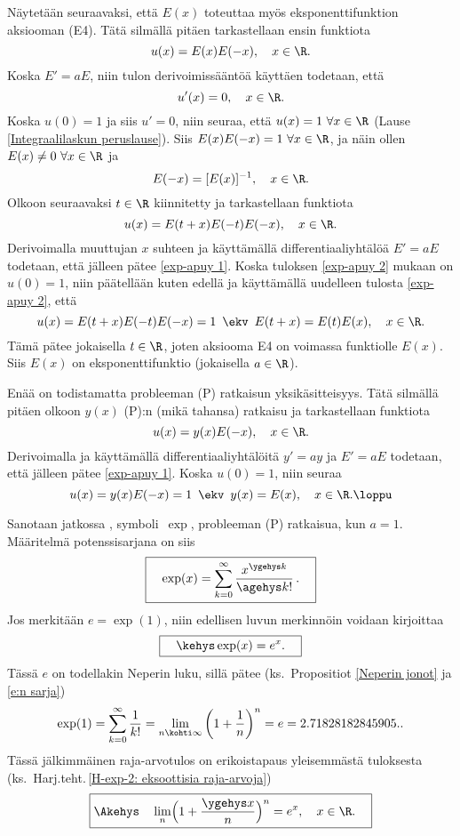 Näytetään seuraavaksi, että $E(x)$ toteuttaa myös eksponenttifunktion aksiooman (E4). Tätä
silmällä pitäen tarkastellaan ensin funktiota
\[
u(x) = E(x)E(-x), \quad x\in\R.
\]
Koska $E'=aE$, niin tulon derivoimissääntöä käyttäen todetaan, että
\begin{equation} \label{exp-apuy 1}
u'(x)=0, \quad x\in\R.
\end{equation}
Koska $u(0)=1$ ja siis $u'=0$, niin seuraa, että $u(x)=1\ \forall x\in\R$
(Lause \ref{Integraalilaskun peruslause}). Siis $E(x)E(-x)=1\ \forall x\in\R$, ja näin ollen 
$E(x) \neq 0\ \forall x\in\R$ ja
\begin{equation} \label{exp-apuy 2}
E(-x) = [E(x)]^{-1}, \quad x\in\R.
\end{equation}
Olkoon seuraavaksi $t\in\R$ kiinnitetty ja tarkastellaan funktiota
\[
u(x) = E(t+x)E(-t)E(-x), \quad x\in\R.
\]
Derivoimalla muuttujan $x$ suhteen ja käyttämällä differentiaaliyhtälöä $E'=aE$ todetaan, että 
jälleen pätee \eqref{exp-apuy 1}. Koska tuloksen \eqref{exp-apuy 2} mukaan on $u(0)=1$, niin 
päätellään kuten edellä ja käyttämällä uudelleen tulosta \eqref{exp-apuy 2}, että
\[
u(x)=E(t+x)E(-t)E(-x)=1\,\ \ekv\,\ E(t+x)= E(t)E(x), \quad x\in\R.
\]
Tämä pätee jokaisella $t\in\R$, joten aksiooma E4 on voimassa funktiolle $E(x)$. Siis 
$E(x)$ on eksponenttifunktio (jokaisella $a\in\R$).

Enää on todistamatta probleeman (P) ratkaisun yksikäsitteisyys. Tätä silmällä pitäen
olkoon $y(x)$ (P):n (mikä tahansa) ratkaisu ja tarkastellaan funktiota
\[
u(x)=y(x)E(-x), \quad x\in\R.
\]
Derivoimalla ja käyttämällä differentiaaliyhtälöitä $y'=ay$ ja $E'=aE$ todetaan, että jälleen 
pätee \eqref{exp-apuy 1}. Koska $u(0)=1$, niin seuraa
\[
u(x)=y(x)E(-x)=1\,\ \ekv\,\ y(x)=E(x), \quad x\in\R. \loppu
\]

Sanotaan jatkossa , symboli $\,\exp$, probleeman (P) ratkaisua,
kun $a=1$. Määritelmä potenssisarjana on siis
\[
\boxed{\quad \exp(x) = \sum_{k=0}^\infty \frac{x^{\ygehys k}}{\agehys k!}\,. \quad}
\]
Jos merkitään $e=\exp(1)$, niin edellisen luvun merkinnöin voidaan kirjoittaa
\[
\boxed{\quad\kehys \exp(x) = e^x. \quad}
\]
Tässä $e$ on todellakin Neperin luku, sillä pätee (ks.\ Propositiot \ref{Neperin jonot} ja
\ref{e:n sarja})
\[
\exp(1) = \sum_{k=0}^\infty \frac{1}{k!} = \lim_{n\kohti\infty}\left(1+\frac{1}{n}\right)^n
                                         = e = 2.71828182845905..
\]
Tässä jälkimmäinen raja-arvotulos on erikoistapaus yleisemmästä tuloksesta
(ks.\ Harj.teht.\,\ref{H-exp-2: eksoottisia raja-arvoja})
\[
\boxed{\Akehys\quad \lim_n \Bigl(1+\frac{\ygehys x}{n}\Bigr)^n = e^x, \quad x\in\R. \quad }
\]

